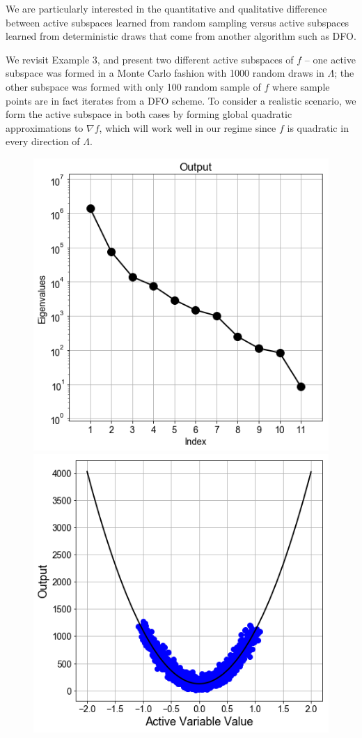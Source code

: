 \documentclass{amsart}
\begin{document}
We are particularly interested in the quantitative and qualitative difference between active subspaces learned from random sampling versus active subspaces learned from deterministic draws that come from another algorithm such as DFO.


We revisit Example 3, and present two different active subspaces of $f$ -- one active subspace was formed in a Monte Carlo fashion with 1000 random draws in $\Lambda$; the other subspace was formed with only 100 random sample of $f$ where sample points are in fact iterates from a DFO scheme. To consider a realistic scenario, we form the active subspace in both cases by forming global quadratic approximations to $\nabla f$, which will work well in our regime since $f$ is quadratic in every direction of $\Lambda$.

\begin{figure} 
\includegraphics[scale=0.3]{eigs.png} \includegraphics[scale=0.3]{surr.png}


\end{figure}
\end{document}
